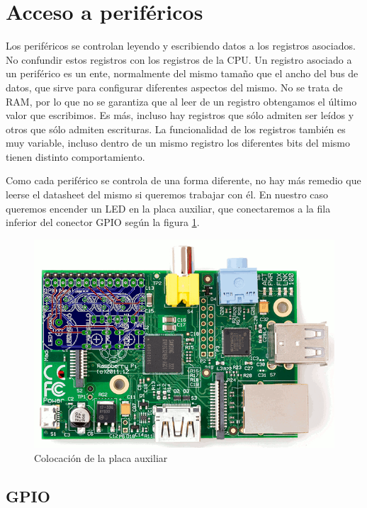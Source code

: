\section{Acceso a periféricos}

Los periféricos se controlan leyendo y escribiendo datos a los registros asociados. No
confundir estos registros con los registros de la CPU. Un registro asociado a un periférico
es un ente, normalmente del mismo tamaño que el ancho del bus de datos, que sirve para
configurar diferentes aspectos del mismo. No se trata de RAM, por lo que no se garantiza que
al leer de un registro obtengamos el último valor que escribimos. Es más, incluso hay
registros que sólo admiten ser leídos y otros que sólo admiten escrituras. La funcionalidad
de los registros también es muy variable, incluso dentro de un mismo registro los diferentes
bits del mismo tienen distinto comportamiento.

Como cada periférico se controla de una forma diferente, no hay más remedio que leerse
el datasheet del mismo si queremos trabajar con él. En nuestro caso queremos encender un LED
en la placa auxiliar, que conectaremos a la fila inferior del conector GPIO según la
figura \ref{fig:posicionaux}.

\begin{figure}[h]
  \centering
    \includegraphics[width=14cm]{graphs/posicionaux.png}
  \caption{Colocación de la placa auxiliar}
  \label{fig:posicionaux}
\end{figure}


\subsection{GPIO}

